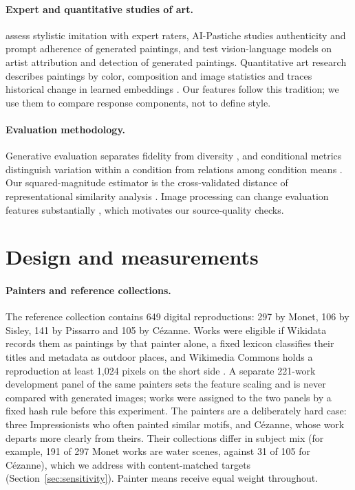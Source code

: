 \documentclass[10pt]{article}
\begin{document}
\paragraph{Expert and quantitative studies of art.}
\citet{deliege2025} assess stylistic imitation with expert raters, AI-Pastiche
\citep{asperti2025pastiche} studies authenticity and prompt adherence of generated
paintings, and \citet{fu2025aiwikiart} test vision-language models on artist attribution
and detection of generated paintings. Quantitative art research describes paintings by
color, composition and image statistics \citep{kim2014,sigaki2018,lee2020} and traces
historical change in learned embeddings \citep{kim2026}. Our features follow this tradition;
we use them to compare response components, not to define style.

\paragraph{Evaluation methodology.}
Generative evaluation separates fidelity from diversity \citep{naeem2020}, and conditional
metrics distinguish variation within a condition from relations among condition means
\citep{benny2021conditional}. Our squared-magnitude estimator is the cross-validated
distance of representational similarity analysis \citep{diedrichsen2017representational}.
Image processing can change evaluation features substantially \citep{parmar2022}, which
motivates our source-quality checks.

\section{Design and measurements}\label{sec:design}

\paragraph{Painters and reference collections.}
The reference collection contains 649 digital reproductions: 297 by Monet, 106 by Sisley,
141 by Pissarro and 105 by C\'ezanne. Works were eligible if Wikidata records them as
paintings by that painter alone, a fixed lexicon classifies their titles and metadata as
outdoor places, and Wikimedia Commons holds a reproduction at least 1,024 pixels on the
short side \citep{commonsglam,vrandecic2014wikidata}. A separate 221-work development
panel of the same painters sets the feature scaling and is never compared with generated
images; works were assigned to the two panels by a fixed hash rule before this experiment.
The painters are a deliberately hard case: three Impressionists who often painted similar
motifs, and C\'ezanne, whose work departs more clearly from theirs. Their collections differ
in subject mix (for example, 191 of 297 Monet works are water scenes, against 31 of 105 for
C\'ezanne), which we address with content-matched targets (Section~\ref{sec:sensitivity}).
Painter means receive equal weight throughout.
\end{document}
